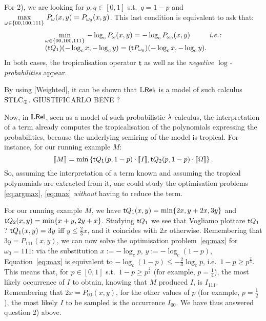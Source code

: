 For 2), %
we are looking for $p,q\in[0,1]$ s.t.\ $q=1-p$ and
$\max\limits_{\omega\in\{00,100,111\}} \, P_\omega(x,y) = P_{\omega_0}(x,y)$.
This last condition is equivalent to ask that:
\begin{equation}
  \begin{array}{l@{}l@{}}
    \min\limits_{\omega\in\set{00,100,111}} \, -\log_c P_\omega(x,y) = -\log_c P_{\omega_0}(x,y)
   & \textit{ i.e.: }
   \\
   (\trop Q_1)( -\log_c x, -\log_c y) = (\trop P_{\omega_0})( -\log_c x, -\log_c y). &  \label{eq:max}
  \end{array}
\end{equation}
In both cases, the tropicalisation operator $\mathsf{t}$ as well as the \emph{negative $\log$-probabilities} appear.

\begin{fact}
 By using [Weighted], it can be shown that $\mathbb{L} \mathsf{Rel}_!$ is a model of such calculus $\mathrm{STLC}_\oplus$. {\color{red}GIUSTIFICARLO BENE ?}
\end{fact}

Now, in $\mathbb{L} \mathsf{Rel}$, seen as a model of such probabilistic $\lambda$-calculus, the interpretation of a term already computes the tropicalisation of the polynomials expressing the probabilities, because the underlying semiring of the model is tropical.
For instance, for our running example $M$:
\[\llbracket M\rrbracket = \min\left\{\mathsf{t} Q_1(p,1-p) \cdot \llbracket I\rrbracket, \mathsf{t} Q_2(p,1-p) \cdot \llbracket\Omega\rrbracket\right\}.\]
So, assuming the interpretation of a term known and assuming the tropical polynomials are extracted from it, one could study the optimisation problems \ref{eq:argmax}, \ref{eq:max} \emph{without} having to reduce the term.

\begin{example}\label{ex:study}
 For our running example $M$, we have $\mathsf{t} Q_1(x,y)=\min\{2x,y+2x,3y\}$ and $\mathsf{t} Q_2(x,y)=\min\{x+y,2y+x\}$.
 Studying $\mathsf{t} Q_1$ we see that {\color{red}Vogliamo plottare $\mathsf{t} Q_1$ ?}
 $\mathsf{t} Q_1(x,y)=3y$ iff $y\leq \frac{2}{3}x$, and it coincides with $2x$ otherwise.
 Remembering that $3y=P_{111}(x,y)$, we can now solve the optimisation problem~\ref{eq:max} for $\omega_0=111$:
 via the substitution $x:=-\log_c p$, $y:=-\log_c (1-p)$, Equation~\ref{eq:max} is equivalent to $-\log_c (1-p)\leq -\frac{2}{3}\log_c p$, i.e.\ $1-p\geq p^{\frac{2}{3}}$.
 This means that, for $p\in[0,1]$ s.t.\ $1-p\geq p^{\frac{2}{3}}$ (for example, $p=\frac{1}{4}$), the most likely occurrence of $I$ to obtain, knowing that $M$ produced $I$, is $I_{111}$.
 Remembering that $2x=P_{00}(x,y)$, for the other values of $p$ (for example, $p=\frac{1}{2}$), the most likely $I$ to be sampled is the occurrence $I_{00}$.
 We have thus answered question 2) above.
\end{example}

